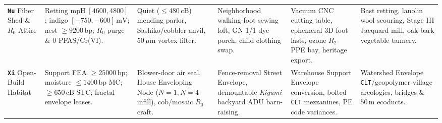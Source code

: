 \begin{table}[htbp]
{\begin{tabular}{@{}p{1.45cm}p{2.65cm}p{2.55cm}p{2.55cm}p{2.65cm}p{2.65cm}@{}}
\addlinespace[4pt]
\textbf{\texttt{Nu}} \newline Fiber Shed \& $R_0$ Attire & Retting $\mathrm{mpH}\;[4600,4800]$; indigo $[-750,-600]\,\mathrm{mV}$; nest $\ge 9200\,\mathrm{bp}$; $R_0$ purge \& $0$ PFAS/Cr(VI). & Quiet ($\le 480\,\mathrm{cB}$) mending parlor, Sashiko/cobbler anvil, $50\,\mu\mathrm{m}$ vortex filter. & Neighborhood walking-foot sewing loft, GN 1/1 dye porch, child clothing swap. & Vacuum CNC cutting table, ephemeral 3D foot lasts, ozone $R_2$ PPE bay, heritage export. & Bast retting, lanolin wool scouring, Stage III Jacquard mill, oak-bark vegetable tannery. \\
\addlinespace[4pt]
\textbf{\texttt{Xi}} \newline Open-Build Habitat & Support FEA $\ge 25000\,\mathrm{bp}$; moisture $\le 1400\,\mathrm{bp}$ MC; $\ge 650\,\mathrm{cB}$ STC; fractal envelope leases. & Blower-door air seal, House Enveloping Node ($N=1, N=4$ infill), cob/mosaic $R_0$ craft. & Fence-removal Street Envelope, demountable \emph{Kigumi} backyard ADU barn-raising. & Warehouse Support Envelope conversion, bolted \texttt{CLT} mezzanines, PE code variances. & Watershed Envelope \texttt{CLT}/geopolymer village arcologies, bridges \& $50\,\mathrm{m}$ ecoducts. \\
\bottomrule
\end{tabular}%
}
\end{table}

